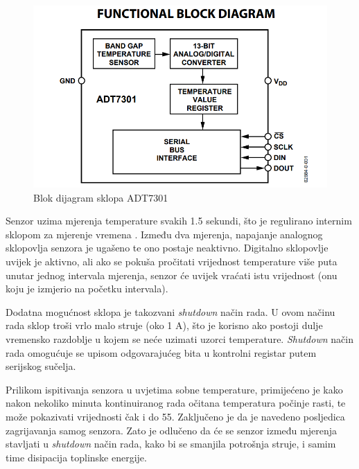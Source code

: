 \begin{figure}[htb]
    \centering
    \includegraphics{slike/ADT7301_blok_dijagram.png}
    \caption{Blok dijagram sklopa ADT7301 \cite{adt7301_datasheet}}
    \label{fig:adt7301_blok_dijagram}
\end{figure}

Senzor uzima mjerenja temperature svakih 1.5 sekundi, što je regulirano internim sklopom za mjerenje vremena . Između dva mjerenja, napajanje analognog sklopovlja senzora je ugašeno te ono postaje neaktivno. Digitalno sklopovlje uvijek je aktivno, ali ako se pokuša pročitati vrijednost temperature više puta unutar jednog intervala mjerenja, senzor će uvijek vraćati istu vrijednost (onu koju je izmjerio na početku intervala).

Dodatna mogućnost sklopa je takozvani \textit{shutdown} način rada. U ovom načinu rada sklop troši vrlo malo struje (oko 1 \textmu{}A), što je korisno ako postoji dulje vremensko razdoblje u kojem se neće uzimati uzorci temperature. \textit{Shutdown} način rada omogućuje se upisom odgovarajućeg bita u kontrolni registar putem serijskog sučelja.

Prilikom ispitivanja senzora u uvjetima sobne temperature, primijećeno je kako nakon nekoliko minuta kontinuiranog rada očitana temperatura počinje rasti, te može pokazivati vrijednosti čak i do 55\textcelsius{}. Zaključeno je da je navedeno posljedica zagrijavanja samog senzora. Zato je odlučeno da će se senzor između mjerenja stavljati u \textit{shutdown} način rada, kako bi se smanjila potrošnja struje, i samim time disipacija toplinske energije.
